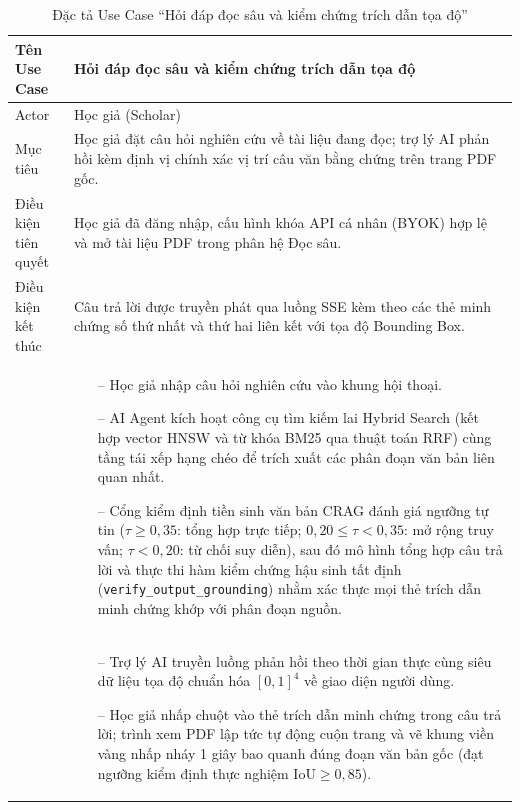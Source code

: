 \begingroup
\setlength{\tabcolsep}{6pt}
\renewcommand{\arraystretch}{1.20}
\begin{xltabular}{\textwidth}{|>{\raggedright\arraybackslash}m{3.2cm}|>{\raggedright\arraybackslash}X|}
\caption{Đặc tả Use Case ``Hỏi đáp đọc sâu và kiểm chứng trích dẫn tọa độ''} \label{tab:uc_doc_sau_spec} \\
\hline
\endfirsthead

\hline
\endhead

\hline
\endfoot

\hline
\endlastfoot

Tên Use Case & Hỏi đáp đọc sâu và kiểm chứng trích dẫn tọa độ \tabularnewline \hline
Actor & Học giả (Scholar) \tabularnewline \hline
Mục tiêu & Học giả đặt câu hỏi nghiên cứu về tài liệu đang đọc; trợ lý AI phản hồi kèm định vị chính xác vị trí câu văn bằng chứng trên trang PDF gốc. \tabularnewline \hline
Điều kiện tiên quyết & Học giả đã đăng nhập, cấu hình khóa API cá nhân (BYOK) hợp lệ và mở tài liệu PDF trong phân hệ Đọc sâu. \tabularnewline \hline
Điều kiện kết thúc & Câu trả lời được truyền phát qua luồng SSE kèm theo các thẻ minh chứng số thứ nhất và thứ hai liên kết với tọa độ Bounding Box. \tabularnewline \hline
{} & 
\begin{itemize}[leftmargin=*, noitemsep, topsep=0pt]
    \item[--] Học giả nhập câu hỏi nghiên cứu vào khung hội thoại.
    \item[--] AI Agent kích hoạt công cụ tìm kiếm lai Hybrid Search (kết hợp vector HNSW và từ khóa BM25 qua thuật toán RRF) cùng tầng tái xếp hạng chéo để trích xuất các phân đoạn văn bản liên quan nhất.
    \item[--] Cổng kiểm định tiền sinh văn bản CRAG đánh giá ngưỡng tự tin ($\tau \ge 0{,}35$: tổng hợp trực tiếp; $0{,}20 \le \tau < 0{,}35$: mở rộng truy vấn; $\tau < 0{,}20$: từ chối suy diễn), sau đó mô hình tổng hợp câu trả lời và thực thi hàm kiểm chứng hậu sinh tất định (\texttt{verify\_output\_grounding}) nhằm xác thực mọi thẻ trích dẫn minh chứng khớp với phân đoạn nguồn.
\end{itemize} \tabularnewline {}
& 
\begin{itemize}[leftmargin=*, noitemsep, topsep=0pt]
    \item[--] Trợ lý AI truyền luồng phản hồi theo thời gian thực cùng siêu dữ liệu tọa độ chuẩn hóa $[0, 1]^4$ về giao diện người dùng.
    \item[--] Học giả nhấp chuột vào thẻ trích dẫn minh chứng trong câu trả lời; trình xem PDF lập tức tự động cuộn trang và vẽ khung viền vàng nhấp nháy 1 giây bao quanh đúng đoạn văn bản gốc (đạt ngưỡng kiểm định thực nghiệm $\text{IoU} \ge 0{,}85$).

\end{itemize}
\end{xltabular}
